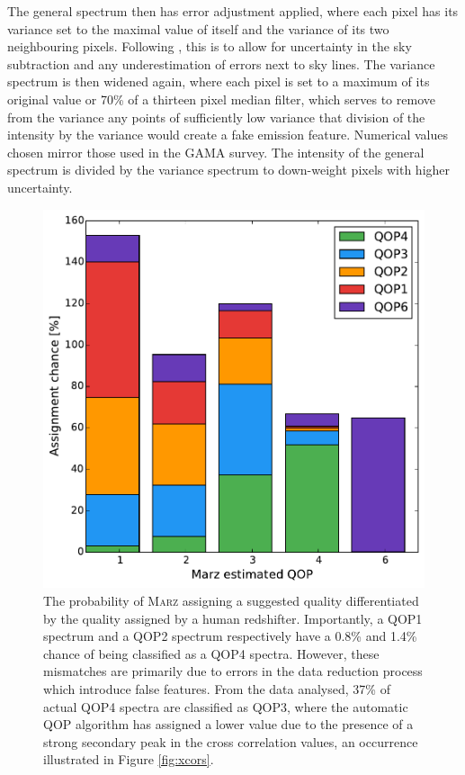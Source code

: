 \documentclass[iop]{emulateapj}
\newcommand{\marz}{\textsc{Marz}}
\begin{document}
The general spectrum then has error adjustment applied, where each pixel has its variance set to the maximal value of itself and the variance of its two neighbouring pixels. Following \citet{baldry2014galaxy}, this is to allow for uncertainty in the sky subtraction and any underestimation of errors next to sky lines. The variance spectrum is then widened again, where each pixel is set to a maximum of its original value or 70\% of a thirteen pixel median filter, which serves to remove from the variance any points of sufficiently low variance that division of the intensity by the variance would create a fake emission feature. Numerical values chosen mirror those used in the GAMA survey. The intensity of the general spectrum is divided by the variance spectrum to down-weight pixels with higher uncertainty. 


\begin{figure}[h]
\centering
\includegraphics[width=\columnwidth]{autoqop.pdf}
\caption{The probability of \marz{} assigning a suggested quality differentiated by the quality assigned by a human redshifter. Importantly, a QOP1 spectrum and a QOP2 spectrum respectively have a 0.8\%  and 1.4\% chance of being classified as a QOP4 spectra. However, these mismatches are primarily due to errors in the data reduction process which introduce false features. From the data analysed, 37\% of actual QOP4 spectra are classified as QOP3, where the automatic QOP algorithm has assigned a lower value due to the presence of a strong secondary peak in the cross correlation values, an occurrence illustrated in Figure \ref{fig:xcors}.}
\label{fig:autoqop}
\end{figure}
\end{document}
